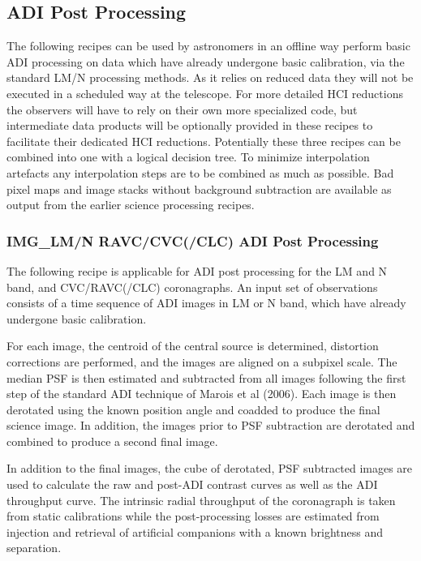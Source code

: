 
\subsection{ADI Post Processing}
\label{ssec:ADI_postprocessing}



The following recipes can be used by astronomers in an offline way
perform basic ADI processing on data which have already undergone
basic calibration, via the standard LM/N processing methods.  As it
relies on reduced data they will not be executed in a scheduled way at
the telescope. For more detailed HCI reductions the observers will
have to rely on their own more specialized code, but intermediate data
products will be optionally provided in these recipes to facilitate
their dedicated HCI reductions. Potentially these three recipes can be combined into one with a logical decision tree. To minimize interpolation artefacts any interpolation steps are to be combined as much as possible. Bad pixel maps and image stacks without background subtraction are available as output from the earlier science processing recipes.

\subsubsection{IMG\_LM/N RAVC/CVC(/CLC) ADI Post Processing}
\label{sssec:adi_img_vc}


The following recipe is applicable for ADI post processing for the LM
and N band, and CVC/RAVC(/CLC) coronagraphs. An input set of
observations consists of a time sequence of ADI images in LM or N band, which have already undergone basic calibration.

For each image, the centroid of the central source is determined, distortion corrections are performed, and the images are aligned on a subpixel scale. The median PSF is then estimated and subtracted from all images following the first step of the standard ADI technique of Marois et al (2006).
Each image is then derotated using the known position angle and coadded to produce the final science image. In addition, the images prior to PSF subtraction are derotated and combined to produce a second final image.

In addition to the final images, the cube of derotated, PSF subtracted images are used to calculate the raw and post-ADI contrast curves as well as the ADI throughput curve. The intrinsic radial throughput of the coronagraph  is taken from static calibrations while the post-processing losses are estimated from injection and retrieval of artificial companions with a known brightness and separation.

